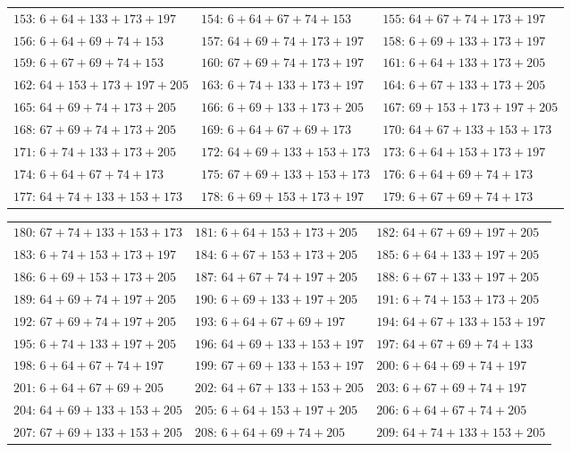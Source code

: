 \begin{center}
\begin{tabular}{lll}
$153$: $6+64+133+173+197$ & $154$: $6+64+67+74+153$ & $155$: $64+67+74+173+197$\\
$156$: $6+64+69+74+153$ & $157$: $64+69+74+173+197$ & $158$: $6+69+133+173+197$\\
$159$: $6+67+69+74+153$ & $160$: $67+69+74+173+197$ & $161$: $6+64+133+173+205$\\
$162$: $64+153+173+197+205$ & $163$: $6+74+133+173+197$ & $164$: $6+67+133+173+205$\\
$165$: $64+69+74+173+205$ & $166$: $6+69+133+173+205$ & $167$: $69+153+173+197+205$\\
$168$: $67+69+74+173+205$ & $169$: $6+64+67+69+173$ & $170$: $64+67+133+153+173$\\
$171$: $6+74+133+173+205$ & $172$: $64+69+133+153+173$ & $173$: $6+64+153+173+197$\\
$174$: $6+64+67+74+173$ & $175$: $67+69+133+153+173$ & $176$: $6+64+69+74+173$\\
$177$: $64+74+133+153+173$ & $178$: $6+69+153+173+197$ & $179$: $6+67+69+74+173$
\end{tabular}
\end{center}
\begin{center}\scriptsize
\begin{tabular}{lll}
$180$: $67+74+133+153+173$ & $181$: $6+64+153+173+205$ & $182$: $64+67+69+197+205$\\
$183$: $6+74+153+173+197$ & $184$: $6+67+153+173+205$ & $185$: $6+64+133+197+205$\\
$186$: $6+69+153+173+205$ & $187$: $64+67+74+197+205$ & $188$: $6+67+133+197+205$\\
$189$: $64+69+74+197+205$ & $190$: $6+69+133+197+205$ & $191$: $6+74+153+173+205$\\
$192$: $67+69+74+197+205$ & $193$: $6+64+67+69+197$ & $194$: $64+67+133+153+197$\\
$195$: $6+74+133+197+205$ & $196$: $64+69+133+153+197$ & $197$: $64+67+69+74+133$\\
$198$: $6+64+67+74+197$ & $199$: $67+69+133+153+197$ & $200$: $6+64+69+74+197$\\
$201$: $6+64+67+69+205$ & $202$: $64+67+133+153+205$ & $203$: $6+67+69+74+197$\\
$204$: $64+69+133+153+205$ & $205$: $6+64+153+197+205$ & $206$: $6+64+67+74+205$\\
$207$: $67+69+133+153+205$ & $208$: $6+64+69+74+205$ & $209$: $64+74+133+153+205$
\end{tabular}
\end{center}

